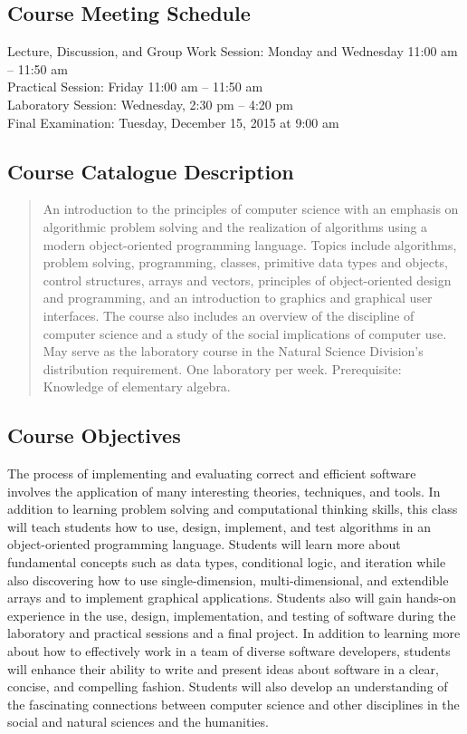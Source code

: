 \subsection*{Course Meeting Schedule}

Lecture, Discussion, and Group Work Session: Monday and Wednesday 11:00 am -- 11:50 am \\
Practical Session: Friday 11:00 am -- 11:50 am \\
Laboratory Session: Wednesday, 2:30 pm -- 4:20 pm \\
Final Examination: Tuesday, December 15, 2015 at 9:00 am

\subsection*{Course Catalogue Description}

\begin{quote}

An introduction to the principles of computer science with an emphasis on algorithmic problem solving and the
realization of algorithms using a modern object-oriented programming language. Topics include algorithms, problem
solving, programming, classes, primitive data types and objects, control structures, arrays and vectors, principles of
object-oriented design and programming, and an introduction to graphics and graphical user interfaces. The course also
includes an overview of the discipline of computer science and a study of the social implications of computer use. May
serve as the laboratory course in the Natural Science Division's distribution requirement. One laboratory per week.
Prerequisite: Knowledge of elementary algebra.

\end{quote}

\subsection*{Course Objectives}

The process of implementing and evaluating correct and efficient software involves the application of many interesting
theories, techniques, and tools.  In addition to learning problem solving and computational thinking skills, this class
will teach students how to use, design, implement, and test algorithms in an object-oriented programming language.
Students will learn more about fundamental concepts such as data types, conditional logic, and iteration while also
discovering how to use single-dimension, multi-dimensional, and extendible arrays and to implement graphical
applications.  Students also will gain hands-on experience in the use, design, implementation, and testing of software
during the laboratory and practical sessions and a final project.  In addition to learning more about how to effectively
work in a team of diverse software developers, students will enhance their ability to write and present ideas about software in
a clear, concise, and compelling fashion.  Students will also develop an understanding of the fascinating connections
between computer science and other disciplines in the social and natural sciences and the humanities.

